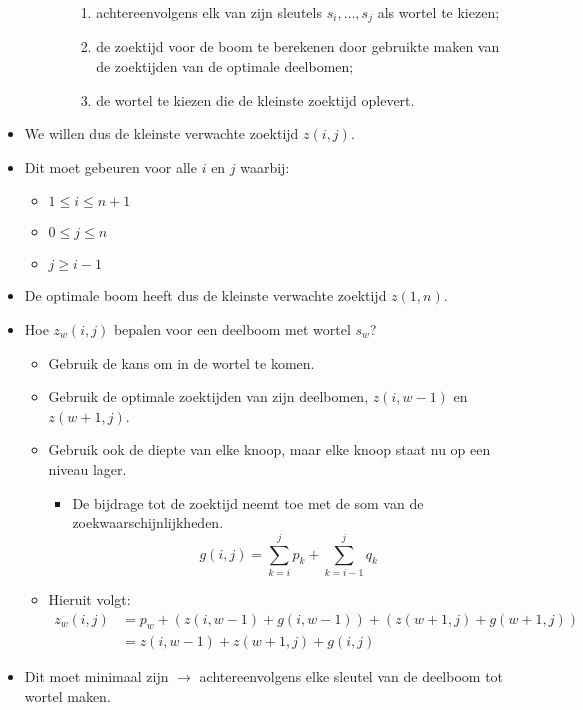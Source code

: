 \begin{itemize}
\begin{itemize}
\begin{itemize}
\begin{enumerate}
                \item achtereenvolgens elk van zijn sleutels $s_i, \dots, s_j$ als wortel te kiezen;
                \item de zoektijd voor de boom te berekenen door gebruikte maken van de zoektijden van de optimale deelbomen;
                \item de wortel te kiezen die de kleinste zoektijd oplevert.
            \end{enumerate} 
        \end{itemize}
    \end{itemize}
    \item We willen dus de kleinste verwachte zoektijd $z(i, j)$.
    \item Dit moet gebeuren voor alle $i$ en $j$ waarbij:
    \begin{itemize}
        \item $1 \leq i \leq n + 1$
        \item $0 \leq j \leq n$
        \item $j \geq i - 1$
    \end{itemize}
    \item De optimale boom heeft dus de kleinste verwachte zoektijd $z(1, n)$.
    \item Hoe $z_w(i, j)$ bepalen voor een deelboom met wortel $s_w$?
    \begin{itemize}
        \item Gebruik de kans om in de wortel te komen.
        \item Gebruik de optimale zoektijden van zijn deelbomen, $z(i, w - 1)$ en $z(w + 1, j)$.
        \item Gebruik ook de diepte van elke knoop, maar elke knoop staat nu op een niveau lager. 
        \begin{itemize}
            \item De bijdrage tot de zoektijd neemt toe met de som van de zoekwaarschijnlijkheden.
            $$g(i, j) = \sum_{k = i}^{j} p_k + \sum_{k = i - 1}^{j} q_k$$
        \end{itemize}
        \item Hieruit volgt:
        \begin{align*}
            z_w(i, j) & = p_w + (z(i, w - 1) + g(i, w - 1)) + (z(w + 1, j) + g(w + 1, j)) \\
                      & = z(i , w - 1) + z(w + 1, j) + g(i, j)
        \end{align*}
    \end{itemize}
    \item Dit moet minimaal zijn $\rightarrow$ achtereenvolgens elke sleutel van de deelboom tot wortel maken.

\end{itemize}
